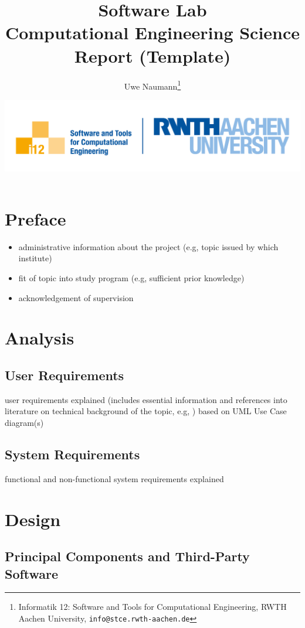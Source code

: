 \documentclass{book}
\title{\bf Software Lab \\ Computational Engineering Science \\
{\small Report (Template)}}
\author{Uwe Naumann\footnote{Informatik 12: Software and Tools for Computational Engineering, RWTH Aachen University, {\tt info@stce.rwth-aachen.de}}}
\date{\includegraphics[width=.6\textwidth]{rwth_i12_softw-werkz_en_rgb}}
\begin{document}

\pagestyle{headings}

\maketitle

\tableofcontents

\chapter*{Preface}

\begin{itemize}
\item administrative information about the project (e.g, topic issued by which institute)
\item fit of topic into study program (e.g, sufficient prior knowledge)
\item acknowledgement of supervision
\end{itemize}

\chapter{Analysis} \label{ch:analysis}

\section{User Requirements}

user requirements explained (includes essential information and references into literature on technical background of the topic, e.g, \cite{Ries1522Rad}) based on UML Use Case diagram(s)

\section{System Requirements}

functional and non-functional system requirements explained

\chapter{Design} \label{ch:design}

\section{Principal Components and Third-Party Software}
\end{document}
